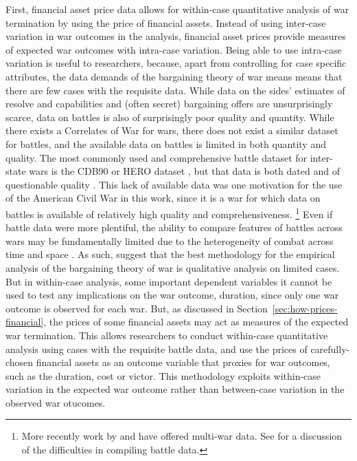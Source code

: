 First, financial asset price data allows for within-case quantitative analysis of war termination by using the price of financial assets.
Instead of using inter-case variation in war outcomes in the analysis, financial asset prices provide measures of expected war outcomes with intra-case variation.
Being able to use intra-case variation is useful to researchers, because, apart from controlling for case specific attributes, the data demands of the bargaining theory of war means means that there are few cases with the requisite data.
While data on the sides' estimates of resolve and capabilities and (often secret) bargaining offers are unsurprisingly scarce, data on battles is also of surprisingly poor quality and quantity.
While there exists a Correlates of War for wars, there does not exist a similar dataset for battles, and the available data on battles is limited in both quantity and quality.
The most commonly used and comprehensive battle dataset for inter-state wars is the CDB90 or HERO dataset \parencites{HistoricalResearchEtAl1984}{cdb90}, but that data is both dated and of questionable quality \parencites[32]{Reiter2003}{BiddleLong2004}.
This lack of available data was one motivation for the use of the American Civil War in this work, since it is a war for which data on battles is available of relatively high quality and comprehensiveness.
\footnote{
More recently work by \textcite{Weisiger2015} and \textcite{CochranLong2014} have offered multi-war data.
See \textcites{cdb90}{Helmbold1995} for a discussion of the difficulties in compiling battle data.
}
Even if battle data were more plentiful, the ability to compare features of battles across wars may be fundamentally limited due to the heterogeneity of combat across time and space \parencite{Reiter2009}.
As such, \textcites{Reiter2003}{Reiter2009} suggest that the best methodology for the empirical analysis of the bargaining theory of war is qualitative analysis on limited cases.
But in within-case analysis, some important dependent variables it cannot be used to test any implications on the war outcome, \eg{}duration, since only one war outcome is observed for each war.
But, as discussed in Section~\ref{sec:how-prices-financial}, the prices of some financial assets may act as measures of the expected war termination.
This allows researchers to conduct within-case quantitative analysis using cases with the requisite battle data, and use the prices of carefully-chosen financial assets as an outcome variable that proxies for war outcomes, such as the duration, cost or victor.
This methodology exploits within-case variation in the expected war outcome rather than between-case variation in the observed war otucomes.

